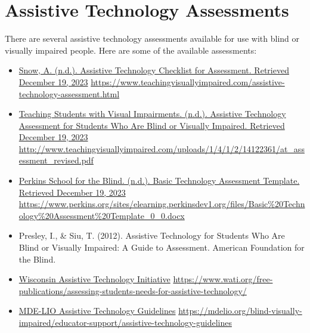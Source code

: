\documentclass[12pt,letterpaper,twoside,openright]{report}
\begin{document}
\begin{appendices}
\hypertarget{trouble4}{}\section[Assistive Technology Assessments]{Assistive Technology Assessments}\label{trouble4}
There are several assistive technology assessments available for use with blind or visually impaired people. Here are some of the available assessments:
\begin{itemize}[leftmargin=*]
\item \href{https://www.teachingvisuallyimpaired.com/assistive-technology-assessment.html}{Snow, A. (n.d.). Assistive Technology Checklist for Assessment. Retrieved December 19, 2023} \break\url{https://www.teachingvisuallyimpaired.com/assistive-technology-assessment.html}
\item \href{http://www.teachingvisuallyimpaired.com/uploads/1/4/1/2/14122361/at_assessment_revised.pdf}{Teaching Students with Visual Impairments. (n.d.). Assistive Technology Assessment for Students Who Are Blind or Visually Impaired. Retrieved December 19, 2023} \break\url{http://www.teachingvisuallyimpaired.com/uploads/1/4/1/2/14122361/at_assessment_revised.pdf}
\item \href{https://www.perkins.org/sites/elearning.perkinsdev1.org/files/Basic\%20Technology\%20Assessment\%20Template_0_0.docx}{Perkins School for the Blind. (n.d.). Basic Technology Assessment Template. Retrieved December 19, 2023} \break\url{https://www.perkins.org/sites/elearning.perkinsdev1.org/files/Basic\%20Technology\%20Assessment\%20Template_0_0.docx}
\item Presley, I., \& Siu, T. (2012). Assistive Technology for Students Who Are Blind or Visually Impaired: A Guide to Assessment. American Foundation for the Blind.
\item \href{https://www.wati.org/free-publications/assessing-students-needs-for-assistive-technology/}{Wisconsin Assistive Technology Initiative} \break\url{https://www.wati.org/free-publications/assessing-students-needs-for-assistive-technology/}
\item \href{https://mdelio.org/blind-visually-impaired/educator-support/assistive-technology-guidelines}{MDE-LIO Assistive Technology Guidelines} \break\url{https://mdelio.org/blind-visually-impaired/educator-support/assistive-technology-guidelines}


\end{itemize}
\end{appendices}
\pagebreak
\end{document}
